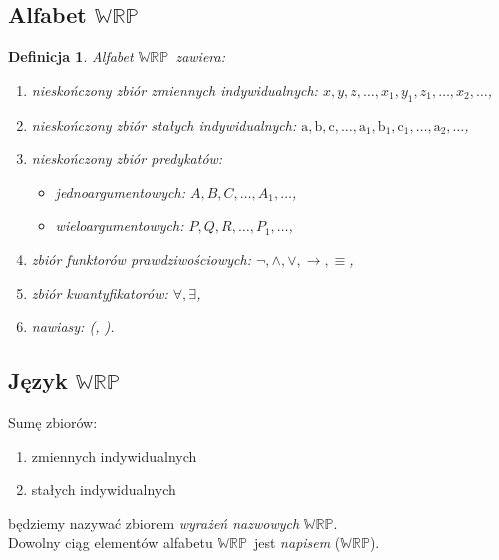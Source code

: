 \documentclass[12pt]{article}
\newtheorem{definicja}{Definicja}
\newcommand {\WRP} {\ensuremath{\mathbb{WRP}}}
\begin{document}
\subsection{Alfabet \WRP}
%
\begin{definicja}
\label{alfabet (WRP)}
Alfabet \WRP~zawiera:
%
\begin{enumerate}
\item nieskończony zbiór zmiennych indywidualnych: $x, y, z, \dots, x_{1}, y_{1}, z_{1}, \dots, x_{2}, \dots$,
%
\item nieskończony zbiór stałych indywidualnych: $\textrm{a}, \textrm{b}, \textrm{c}, \dots, \textrm{a}_{1}, \textrm{b}_{1}, \textrm{c}_{1}, \dots, \textrm{a}_{2}, \dots$,
%
\item nieskończony zbiór predykatów:
\begin{itemize}
\item jednoargumentowych: $A, B, C, \dots, A_{1}, \dots$,
\item wieloargumentowych: $P, Q, R, \dots, P_{1}, \dots$,
\end{itemize}
%
\item zbiór funktorów prawdziwościowych: $\neg, \land, \lor, \to, \equiv$,
%
\item zbiór kwantyfikatorów: $\forall, \exists$,
%
\item nawiasy: (, ).
\end{enumerate}
\end{definicja}
%

\subsection{Język \WRP}
%
Sumę zbiorów:
\begin{enumerate}
\item zmiennych indywidualnych
\item stałych indywidualnych
\end{enumerate}
będziemy nazywać zbiorem \emph{wyrażeń nazwowych} \WRP.\\
%
Dowolny ciąg elementów alfabetu \WRP~jest \emph{napisem} (\WRP).
%
\end{document}
